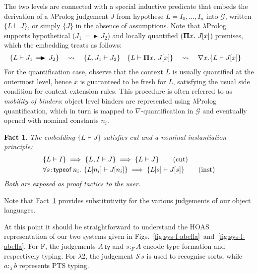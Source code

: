 \documentclass[a4paper,UKenglish]{lipics-v2016}
\newcommand{\ms}{\,}
\newcommand{\mrel}[1]{\mathrel{\ms #1 \ms}}
\newcommand{\mAll}[1]{\ensuremath{\forall} #1.\ms\ms}
\newcommand{\SysL}{$\lambda$2\xspace}
\newcommand{\of}{\ensuremath{\!:\!}}
\newcommand{\istyFh}[1]{\ensuremath{#1\ms\mathsf{ty}}}
\newcommand{\typingFh}[2]{\ensuremath{#1 \mathbin{:_{F}} #2}}
\newcommand{\sortLh}[1]{\ensuremath{\mathcal{S}\ms#1}}
\newcommand{\typingLh}[2]{\ensuremath{#1 \mathbin{:_{\lambda}} #2}}
\newcommand{\lpPi}[1]{\mathbf{\Pi} #1.\ms\ms}
\newcommand{\lpImp}{\mrel{=\!\blacktriangleright}}
\newcommand{\subst}[1]{\hphantom{|}\!\![{#1}]}
\theoremstyle{plain}
\newtheorem{fact}[theorem]{Fact}
\begin{document}
\newcommand{\aje}[1]{\ensuremath{\{#1\}}}
\newcommand{\aj}[2]{\ensuremath{\{#1 \vdash #2\}}}
The two levels are connected with a special inductive predicate that embeds the derivation of a $\lambda$Prolog judgement $J$ from hypothese $L = I_0,\ldots,I_n$ into $\mathcal{G}$, written $\aj{L}{J}$, or simply $\aje{J}$ in the absence of assumptions.
Note that $\lambda$Prolog supports hypothetical ($J_1 \lpImp J_2$) and locally quantified ($\lpPi{x} J\subst{x}$) premises, which the embedding treats as follows:
\begin{align*}
  \aj{L}{J_1 \lpImp J_2} &\quad\leadsto\quad \aj{L, J_1}{J_2} & \aj{L}{\lpPi{x} J\subst{x}}&\quad\leadsto\quad \nabla x. \aj{L}{J\subst{x}}
\end{align*}
For the quantification case, observe that the context $L$ is usually quantified at the outermost level, hence $x$ is guaranteed to be fresh for $L$, satisfying the usual side condition for context extension rules.
This procedure is often referred to as \emph{mobility of binders}: object level binders are represented using $\lambda$Prolog quantification, which in turn is mapped to $\nabla$-quantification in $\mathcal{G}$ and eventually opened with nominal constants $n_i$.
\begin{fact}
  \label{fac:ab-cut-inst}
  The embedding $\aj{L}{J}$ satisfies cut and a nominal instantiation principle:
  \begin{align*}
    &\aj{L}{I} \implies \aj{L,I}{J} \implies \aj{L}{J} \tag{cut} \\
    &\mAll{s \of \mathsf{typeof}\, n_i} \aj{L\subst{n_i}}{J\subst{n_i}} \implies \aj{L\subst{s}}{J\subst{s}} \tag{inst}
  \end{align*}
  Both are exposed as proof tactics to the user.\hfill\qedsymbol
\end{fact}
Note that Fact~\ref{fac:ab-cut-inst} provides substitutivity for the various judgements of our object languages.

At this point it should be straightforward to understand the HOAS representation of our two systems given in Figs.~\ref{fig:sys-f-abella}~and~\ref{fig:sys-l-abella}.
For F, the judgements $\istyFh{A}$ and $\typingFh{s}{A}$ encode type formation and respectively typing.
For \SysL, the judgement $\sortLh{s}$ is used to recognise sorts, while $\typingLh{a}{b}$ represents PTS typing.
\end{document}
